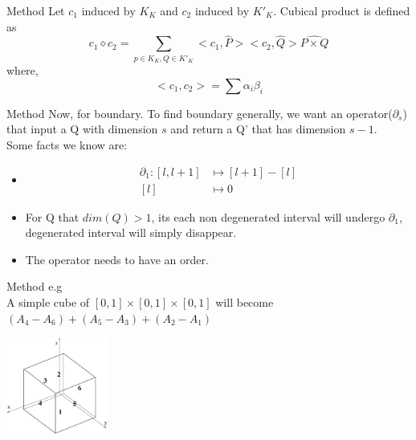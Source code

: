 \documentclass[aspectratio=169,xcolor=dvipsnames]{beamer}
\begin{document}

\begin{frame}{Method}
    Let $c_1 \text{ induced by } K_K$ and $c_2 \text{ induced by } K'_K$. Cubical product is defined as
$$c_1 \diamond c_2 = \sum_{p\in K_K,Q \in K'_K}<c_1, \widehat{P}><c_2, \widehat{Q}> \widehat{P \times Q}$$
where, \\
$$<c_1,c_2>=\sum \alpha_i \beta_i$$
\end{frame}


\begin{frame}{Method}
Now, for boundary. To find boundary generally, we want an operator($\partial_s$) that input a Q with dimension $s$ and return a Q' that has dimension $s-1$. \\[10pt]
Some facts we know are: \\
\begin{itemize}
    \item   \begin{align*}
        \partial_1\colon  [l,l+1] &\mapsto [l+1] - [l]\\
                         [l] &\mapsto 0 
            \end{align*}
    \item For Q that $dim(Q)>1$, its each non degenerated interval will undergo $\partial_1$, degenerated interval will simply disappear. 
    \item The operator needs to have an order.
\end{itemize}
\end{frame}

\begin{frame}{Method}
e.g
\\[10pt]
A simple cube of $[0,1] \times [0,1] \times [0,1]$ will become $(A_4-A_6) + (A_5-A_3) + (A_2-A_1)$

\includegraphics[width=0.25\textwidth]{3}

\end{frame}
\end{document}
